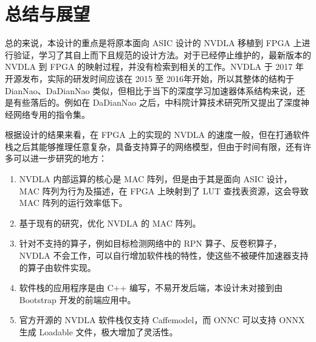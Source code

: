 \chapter{总结与展望}\label{chap:conclusion}

总的来说，本设计的重点是将原本面向 ASIC 设计的 NVDLA 移植到 FPGA 上进行验证，学习了其自上而下且规范的设计方法。对于已经停止维护的，最新版本的 NVDLA 到 FPGA 的映射过程，并没有检索到相关的工作。NVDLA 于 2017 年开源发布，实际的研发时间应该在 2015 至 2016年开始，所以其整体的结构于 DianNao、DaDianNao 类似，但相比于当下的深度学习加速器体系结构来说，还是有些落后的。例如在 DaDianNao 之后，中科院计算技术研究所又提出了深度神经网络专用的指令集。

根据设计的结果来看，在 FPGA 上的实现的 NVDLA 的速度一般，但在打通软件栈之后其能够推理任意复杂，具备支持算子的网络模型，但由于时间有限，还有许多可以进一步研究的地方：

\begin{enumerate}
    \item NVDLA 内部运算的核心是 MAC 阵列，但是由于其是面向 ASIC 设计，MAC 阵列为行为及描述，在 FPGA 上映射到了 LUT 查找表资源，这会导致 MAC 阵列的运行效率低下。
    \item 基于现有的研究\cite{祁琛2018应用于神经网络的高效能计算单元的研究与实现}，优化 NVDLA 的 MAC 阵列。
    \item 针对不支持的算子，例如目标检测网络中的 RPN 算子、反卷积算子，NVDLA 不会工作，可以自行增加软件栈的特性，使这些不被硬件加速器支持的算子由软件实现。
    \item 软件栈的应用程序是由 C++ 编写，不易开发后端，本设计未对接到由 Bootstrap 开发的前端应用中。
    \item 官方开源的 NVDLA 软件栈仅支持 Caffemodel，而 ONNC 可以支持 ONNX 生成 Loadable 文件，极大增加了灵活性。
\end{enumerate}